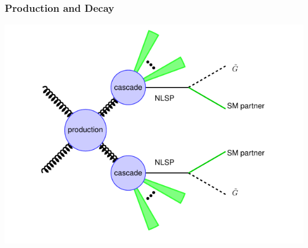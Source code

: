\documentclass{beamer}
\begin{document}
\begin{frame}
\frametitle{Production and Decay }
   \begin{minipage}[t]{0.7\linewidth}
      \includegraphics[width=0.80\paperwidth]{THESISPLOTS/SUSY-DECAY.pdf}
 \end{minipage}
    
\end{frame}    
\end{document}
